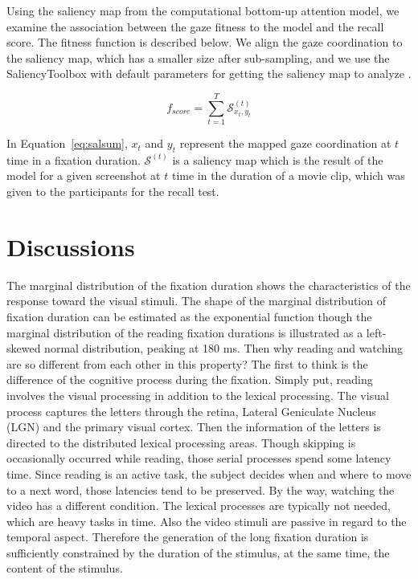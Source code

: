 \documentclass[10pt,letterpaper]{article}
\begin{document}
Using the saliency map from the computational bottom-up attention model, we examine the association between the gaze fitness to the model and the recall score. The fitness function is described below. We align the gaze coordination to the saliency map, which has a smaller size after sub-sampling, and we use the SaliencyToolbox with default parameters for getting the saliency map to analyze \cite{Walther2006}.

\begin{equation}\label{eq:salsum}
f_{score} = \sum_{t=1}^{T} \mathcal{S}_{x_{t},y_{t}}^{(t)}
\end{equation}

In Equation~\ref{eq:salsum}, $x_{t}$ and $y_{t}$ represent the mapped gaze coordination at $t$ time in a fixation duration. $\mathcal{S}^{(t)}$ is a saliency map which is the result of the model for a given screenshot at $t$ time in the duration of a movie clip, which was given to the participants for the recall test.

\section{Discussions}

The marginal distribution of the fixation duration shows the characteristics of the response toward the visual stimuli. The shape of the marginal distribution of fixation duration can be estimated as the exponential function though the marginal distribution of the reading fixation durations is illustrated as a left-skewed normal distribution, peaking at 180 ms. Then why reading and watching are so different from each other in this property? The first to think is the difference of the cognitive process during the fixation. Simply put, reading involves the visual processing in addition to the lexical processing. The visual process captures the letters through the retina, Lateral Geniculate Nucleus (LGN) and the primary visual cortex. Then the information of the letters is directed to the distributed lexical processing areas. Though skipping is occasionally occurred while reading, those serial processes spend some latency time. Since reading is an active task, the subject decides when and where to move to a next word, those latencies tend to be preserved. By the way, watching the video has a different condition. The lexical processes are typically not needed, which are heavy tasks in time. Also the video stimuli are passive in regard to the temporal aspect. Therefore the generation of the long fixation duration is sufficiently constrained by the duration of the stimulus, at the same time, the content of the stimulus. 
\end{document}
